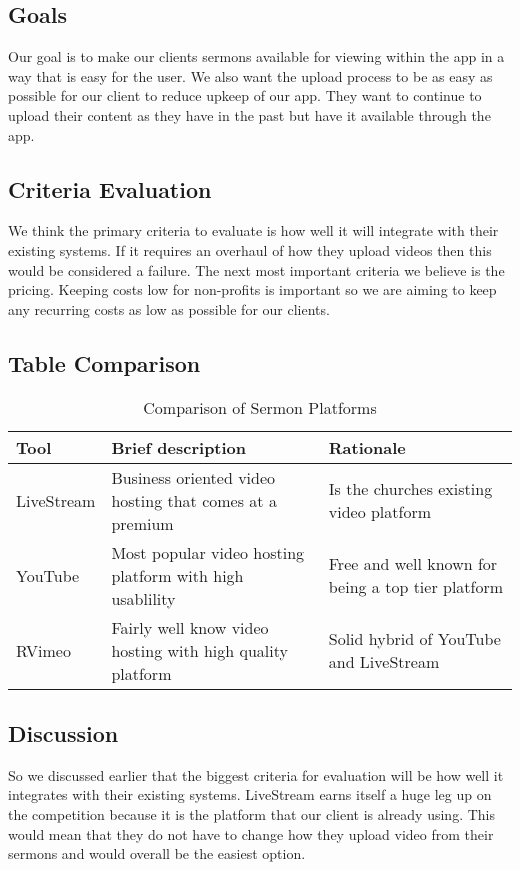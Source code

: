 \documentclass[letterpaper,10pt,draftclsnofoot,onecolumn,titlepage]{IEEEtran}
\begin{document}
	\subsection{Goals}
	Our goal is to make our clients sermons available for viewing within the app in a way that is easy for the user. We also want the upload process to be as easy as possible for our client to reduce upkeep of our app. They want to continue to upload their content as they have in the past but have it available through the app.
	\subsection{Criteria Evaluation}
	We think the primary criteria to evaluate is how well it will integrate with their existing systems. If it requires an overhaul of how they upload videos then this would be considered a failure. The next most important criteria we believe is the pricing. Keeping costs low for non-profits is important so we are aiming to keep any recurring costs as low as possible for our clients. 
	\subsection{Table Comparison}
	\begin{table}[ht]
	\caption{Comparison of Sermon Platforms}
	\begin{center}
	\begin{tabular} { | m{3cm} | m{5cm} | m{5cm} | }
	\hline\hline
	Tool & Brief description & Rationale \\ [0.5ex]
	\hline
	LiveStream & Business oriented video hosting that comes at a premium & Is the churches existing video platform \\
	\hline
	YouTube & Most popular video hosting platform with high usablility & Free and well known for being a top tier platform \\
	\hline
	RVimeo & Fairly well know video hosting with high quality platform & Solid hybrid of YouTube and LiveStream \\
	\hline
	\end{tabular}
	\end{center}
	\end{table}
	\subsection{Discussion}
	So we discussed earlier that the biggest criteria for evaluation will be how well it integrates with their existing systems. LiveStream earns itself a huge leg up on the competition because it is the platform that our client is already using. This would mean that they do not have to change how they upload video from their sermons and would overall be the easiest option.
	
\end{document}
